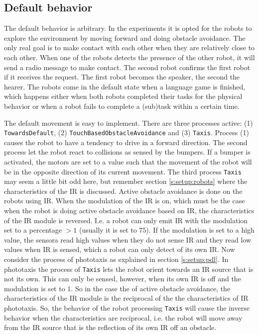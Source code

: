 \subsection{Default behavior} 

The default behavior is arbitrary. In the experiments it is opted for the robots to explore the environment by moving forward and doing obstacle avoidance. The only real goal is to make contact with each other when they are relatively close to each other. When one of the robots detects the presence of the other robot, it will send a radio message to make contact. The second robot confirms the first robot if it receives the request. The first robot becomes the speaker, the second the hearer. The robots come in the default state when a language game is finished, which happens either when both robots completed their tasks for the physical behavior or when a robot fails to complete a (sub)task within a certain time.

\p
The default movement is easy to implement. There are three processes active: (1) \texttt{TowardsDefault}, (2) \texttt{TouchBasedObstacleAvoidance} and (3) \texttt{Taxis}. Process (1) causes the robot to have a tendency to drive in a forward direction. The second process let the robot react to collisions as sensed by the bumpers. If a bumper is activated, the motors are set to a value such that the movement of the robot will be in the opposite direction of its current movement. The third process \texttt{Taxis} may seem a little bit odd here, but remember section \ref{s:setup:robots} where the characteristics of the IR is discussed. Active obstacle avoidance is done on the robots using IR. When the modulation of the IR is on, which must be the case when the robot is doing active obstacle avoidance based on IR, the characteristics of the IR module is reversed. I.e. a robot can only emit IR with the modulation set to a percentage $> 1$ (usually it is set to $75$). If the modulation is set to a high value, the sensora read high values when they do not sense IR and they read low values when IR is sensed, which a robot can only detect of its own IR. Now consider the process of phototaxis as explained in section \ref{s:setup:pdl}. In phototaxis the process of \texttt{Taxis} lets the robot orient towards an IR source that is not its own. This can only be sensed, however, when its own IR is off and the modulation is set to $1$. So in the case the of active obstacle avoidance, the characteristics of the IR module is the reciprocal of the the characteristics of IR phototaxis. So, the behavior of the robot processing \texttt{Taxis} will cause the inverse behavior when the characteristics are reciprocal, i.e. the robot will move away from the IR source that is the reflection of its own IR off an obstacle.


